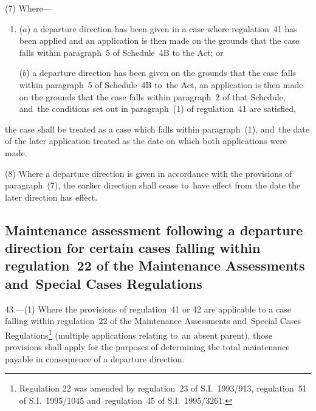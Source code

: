 \documentclass[12pt,a4paper]{article}
\begin{document}
(7) Where—
\begin{enumerate}\item[]
($a$) a departure direction has been given in a case where regulation~41 has been applied and an application is then made on the grounds that the case falls within paragraph~5 of Schedule~4B to the Act; or

($b$) a departure direction has been given on the grounds that the case falls within paragraph~5 of Schedule~4B to~the Act, an application is then made on the grounds that the case falls within paragraph~2 of that Schedule, and~the conditions set out in paragraph~(1) of regulation~41 are satisfied,
\end{enumerate}
the case shall be treated as a case which falls within paragraph~(1), and~the date of the later application treated as the date on which both applications were made.

(8) Where a departure direction is given in accordance with the provisions of paragraph~(7), the earlier direction shall cease to~have effect from the date the later direction has effect.


\subsection[43. Maintenance assessment following a departure direction for certain cases falling
within regulation~22 of the Maintenance Assessments and~Special Cases
Regulations]{Maintenance assessment following a departure direction for certain cases falling
within regulation~22 of the Maintenance Assessments and~Special Cases
Regulations}

43.—(1) Where the provisions of regulation~41 or 42 are applicable to
a case falling within regulation~22 of the Maintenance Assessments and~Special
Cases Regulations\footnote{\frenchspacing Regulation 22 was amended by regulation~23 of S.I.~1993/913, regulation~51 of S.I.~1995/1045 and~regulation~45 of S.I.~1995/3261.} (multiple applications relating to~an absent parent),
those provisions shall apply for the purposes of determining the total
maintenance payable in consequence of a departure direction.
\end{document}
